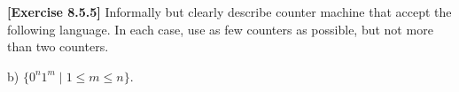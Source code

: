 \textbf{[Exercise 8.5.5]} Informally but clearly describe counter machine that accept
the following language. In each case, use as few counters as possible, but not more 
than two counters.

b) $\{0^n1^m\mid 1\le m\le n\}$.
